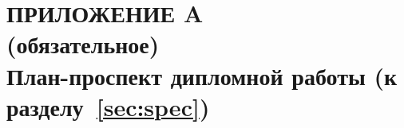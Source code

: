 \renewcommand{\thefigure}{\Asbuk{section}.\arabic{figure}}
\renewcommand{\thetable}{\Asbuk{section}.\arabic{table}}
\renewcommand{\thelstlisting}{\Asbuk{section}.\arabic{lstlisting}}

\section*{%
  ПРИЛОЖЕНИЕ A \\
  (обязательное) \\
  План-проспект дипломной работы (к разделу~\ref{sec:spec})
}
\label{sec:appendix_a}

\pagestyle{fancy}
\fancyhf{}  %
\fancyfoot[R]{\thepage}
\renewcommand{\headrulewidth}{0pt}
\renewcommand{\footrulewidth}{0pt}

\setlength{\headheight}{10mm}
\setlength{\headsep}{\baselineskip}

\thispagestyle{plain}

\setcounter{section}{1}
\setcounter{figure}{0}
\setcounter{table}{0}
\setcounter{lstlisting}{0}

